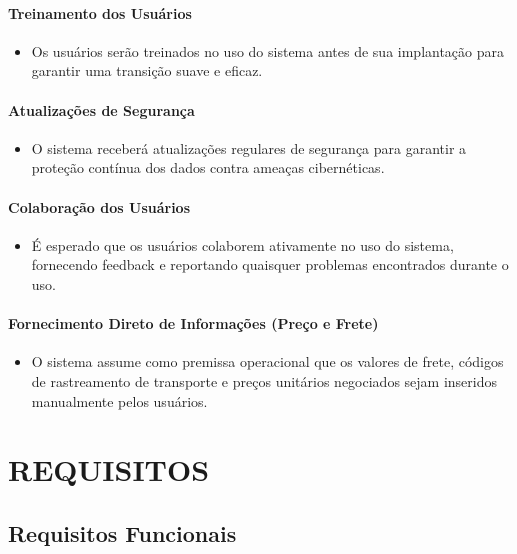 \documentclass[12pt,a4paper]{article}
\begin{document}
\paragraph*{Treinamento dos Usuários}
\begin{itemize}
  \item Os usuários serão treinados no uso do sistema antes de sua implantação para garantir uma transição suave e eficaz.
\end{itemize}

\paragraph*{Atualizações de Segurança}
\begin{itemize}
  \item O sistema receberá atualizações regulares de segurança para garantir a proteção contínua dos dados contra ameaças cibernéticas.
\end{itemize}

\paragraph*{Colaboração dos Usuários}
\begin{itemize}
  \item É esperado que os usuários colaborem ativamente no uso do sistema, fornecendo feedback e reportando quaisquer problemas encontrados durante o uso.
\end{itemize}

\paragraph*{Fornecimento Direto de Informações (Preço e Frete)}
\begin{itemize}
  \item O sistema assume como premissa operacional que os valores de frete, códigos de rastreamento de transporte e preços unitários negociados sejam inseridos manualmente pelos usuários.
\end{itemize}

\section{REQUISITOS}

\subsection{Requisitos Funcionais}
\end{document}
